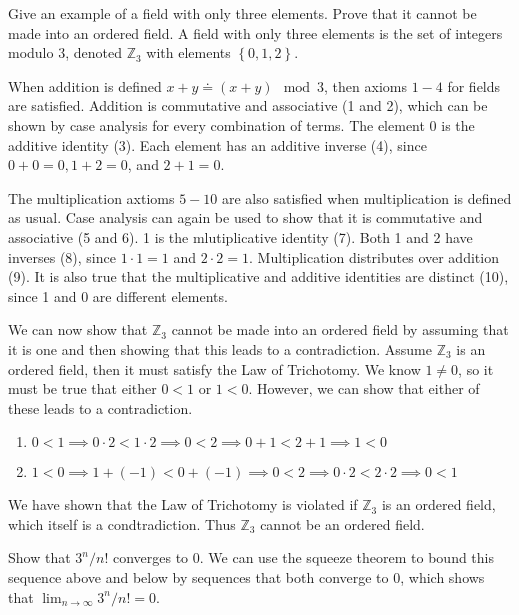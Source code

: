 \documentclass[10pt]{amsart}
\theoremstyle{plain}
\newenvironment{exercise}[1]{%
  \renewcommand\themanualtheoreminner{#1}%
  \manualtheoreminner
}{\endmanualtheoreminner}
\theoremstyle{definition}
\newcommand{\<}{\langle}
\renewcommand{\>}{\rangle}
\begin{document}
\begin{exercise}{1.1.5}
	Give an example of a field with only three elements. Prove that it cannot be made into an ordered field.
\end{exercise}
A field with only three elements is the set of integers modulo 3, denoted $\mathbb{Z}_3$ with elements $\left\{ 0, 1, 2 \right\}$.

When addition is defined $x+y \doteq (x+y) \mod 3$, then axioms $1-4$ for fields are satisfied. Addition is commutative and associative (1 and 2), which can be shown by case analysis for every combination of terms. The element 0 is the additive identity (3). Each element has an additive inverse (4), since $0+0=0, 1+2=0$, and  $2+1=0$.

The multiplication axtioms $5-10$ are also satisfied when multiplication is defined as usual. Case analysis can again be used to show that it is commutative and associative (5 and 6). 1 is the mlutiplicative identity (7). Both 1 and 2 have inverses (8), since $1\cdot 1 = 1$ and $2 \cdot 2 = 1$. Multiplication distributes over addition (9). It is also true that the multiplicative and additive identities are distinct (10), since 1 and 0 are different elements.

We can now show that $\mathbb{Z}_3$ cannot be made into an ordered field by assuming that it is one and then showing that this leads to a contradiction. Assume $\mathbb{Z}_3$ is an ordered field, then it must satisfy the Law of Trichotomy. We know $1 \neq 0$, so it must be true that either $0 < 1$ or $1 < 0$. However, we can show that either of these leads to a contradiction.
\begin{enumerate}
	\item
	$0 < 1 \implies 0\cdot 2 < 1\cdot 2 \implies 0 < 2 \implies 0+1 < 2+1 \implies 1 < 0$
	\item
	$1 < 0 \implies 1+(-1) < 0+(-1) \implies 0 < 2 \implies 0\cdot 2 < 2\cdot 2 \implies 0 < 1$
\end{enumerate}
We have shown that the Law of Trichotomy is violated if $\mathbb{Z}_3$ is an ordered field, which itself is a condtradiction. Thus $\mathbb{Z}_3$ cannot be an ordered field.

\begin{exercise}{1.2.2}
	Show that $3^n / n!$ converges to 0.
\end{exercise}
We can use the squeeze theorem to bound this sequence above and below by sequences that both converge to 0, which shows that $\lim_{n \to \infty} 3^n/n! = 0$.
\end{document}
